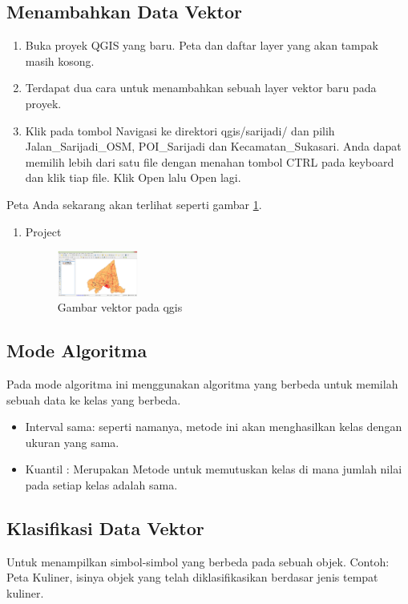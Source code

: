 \subsection{Menambahkan Data Vektor}
\begin{enumerate}
\item 
Buka proyek QGIS yang baru. Peta dan daftar layer yang akan tampak masih kosong.
\item
Terdapat dua cara untuk menambahkan sebuah layer vektor baru pada proyek.
\item
Klik pada tombol Navigasi ke direktori qgis/sarijadi/ dan pilih Jalan\_Sarijadi\_OSM, POI\_Sarijadi dan Kecamatan\_Sukasari. Anda dapat memilih lebih dari satu file dengan menahan tombol CTRL pada keyboard dan klik tiap file. Klik Open lalu Open lagi.
\end{enumerate}

Peta Anda sekarang akan terlihat seperti gambar \ref{vektor}.
\begin{enumerate}
\item
Project
\begin{figure}[ht]
    \centerline{\includegraphics[width=0.25\textwidth]{figures/vektor}}
    \caption{Gambar vektor pada qgis}
    \label{vektor}
    \end{figure}

\end{enumerate}

\subsection{Mode Algoritma}
Pada mode algoritma ini menggunakan algoritma yang berbeda untuk memilah sebuah data ke kelas yang berbeda.
\begin{itemize}
\item	Interval sama: seperti namanya, metode ini akan menghasilkan kelas dengan ukuran yang sama.
\item	Kuantil : Merupakan Metode untuk memutuskan kelas di mana jumlah nilai pada setiap kelas adalah sama.
\end{itemize}

\subsection{Klasifikasi Data Vektor}
Untuk menampilkan simbol-simbol yang berbeda pada sebuah objek. Contoh: Peta Kuliner, isinya objek yang telah diklasifikasikan berdasar jenis tempat kuliner.

